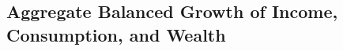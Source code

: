 \documentclass[\econtexRoot/BufferStockTheory]{subfiles}
\begin{document}




\hypertarget{Growth-Rates-of-Individual-Income-and-Consumption}{}
\subsection{Aggregate Balanced Growth of  Income, Consumption, and Wealth}\label{subsec:cGroEqPermGroFacQ}
\end{document}
